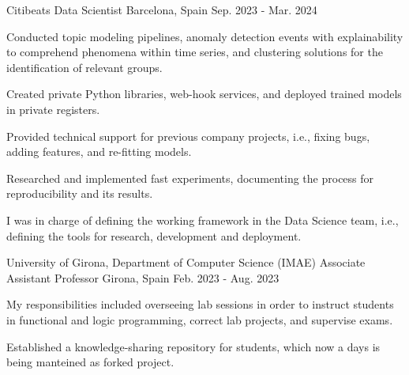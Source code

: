 

\begin{cventries}


  \cventry
  {Citibeats} %
  {Data Scientist} %
  {Barcelona, Spain} %
  {Sep. 2023 - Mar. 2024} %
  {
  \begin{cvitems}
    \item {Conducted topic modeling pipelines, anomaly detection events with
      explainability to comprehend phenomena within time series, and clustering
    solutions for the identification of relevant groups.}
    \item {Created private Python libraries, web-hook services, and deployed
      trained models in private registers.}
    \item {Provided technical support for previous company projects, i.e., fixing
      bugs, adding features, and re-fitting models.}
    \item {Researched and implemented fast experiments, documenting the process for
      reproducibility and its results.}
    \item {I was in charge of defining the working framework in the Data
      Science team, i.e., defining the tools for research, development and deployment.}
  \end{cvitems}
}


  \cventry
  {University of Girona, Department of Computer Science (IMAE)} %
  {Associate Assistant Professor} %
  {Girona, Spain} %
  {Feb. 2023 - Aug. 2023} %
  {
    \begin{cvitems} %
    \item {My responsibilities included overseeing lab
      sessions in order to instruct students in functional and logic programming,
    correct lab projects, and supervise exams.}
    \item{Established a knowledge-sharing repository for students, which now a days is being manteined as forked project.}
    \end{cvitems}
    }



\end{cventries}
